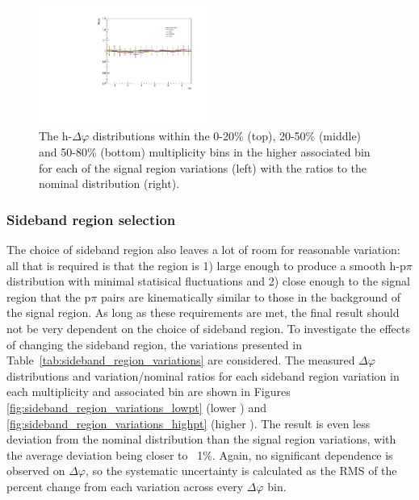 \begin{figure}[ht]
    \includegraphics[width=0.49\textwidth]{figures/analysis/signal_variations_dphi_50_80_highpt_ratio.pdf}
    \caption{The h-\lmb $\Delta\varphi$ distributions within the 0-20\% (top), 20-50\% (middle) and 50-80\% (bottom) multiplicity bins in the higher associated \pt bin for each of the signal region variations (left) with the ratios to the nominal distribution (right).}
    \label{fig:signal_region_variations_highpt}
\end{figure}

\subsubsection{Sideband region selection}
The choice of sideband region also leaves a lot of room for reasonable variation: all that is required is that the region is 1) large enough to produce a smooth h-p$\pi$ distribution with minimal statisical fluctuations and 2) close enough to the signal region that the p$\pi$ pairs are kinematically similar to those in the background of the signal region. As long as these requirements are met, the final result should not be very dependent on the choice of sideband region. To investigate the effects of changing the sideband region, the variations presented in Table~\ref{tab:sideband_region_variations} are considered. The measured $\Delta\varphi$ distributions and variation/nominal ratios for each sideband region variation in each multiplicity and associated \pt bin are shown in Figures \ref{fig:sideband_region_variations_lowpt} (lower \pt) and \ref{fig:sideband_region_variations_highpt} (higher \pt). The result is even less deviation from the nominal distribution than the signal region variations, with the average deviation being closer to ~1\%. Again, no significant dependence is observed on $\Delta\varphi$, so the systematic uncertainty is calculated as the RMS of the percent change from each variation across every $\Delta\varphi$ bin.

